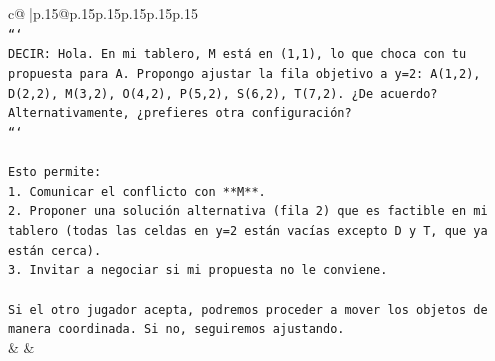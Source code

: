 \documentclass{article}
\begin{document}
{\begin{supertabular}{c@{$\;$}|p{.15\linewidth}@{}p{.15\linewidth}p{.15\linewidth}p{.15\linewidth}p{.15\linewidth}p{.15\linewidth}}
{{{\\ 
\texttt{```} \\
\texttt{DECIR: Hola. En mi tablero, M está en (1,1), lo que choca con tu propuesta para A. Propongo ajustar la fila objetivo a y=2: A(1,2), D(2,2), M(3,2), O(4,2), P(5,2), S(6,2), T(7,2). ¿De acuerdo? Alternativamente, ¿prefieres otra configuración?} \\
\texttt{```} \\
\\ 
\texttt{Esto permite:} \\
\texttt{1. Comunicar el conflicto con **M**.} \\
\texttt{2. Proponer una solución alternativa (fila 2) que es factible en mi tablero (todas las celdas en y=2 están vacías excepto D y T, que ya están cerca).} \\
\texttt{3. Invitar a negociar si mi propuesta no le conviene.} \\
\\ 
\texttt{Si el otro jugador acepta, podremos proceder a mover los objetos de manera coordinada. Si no, seguiremos ajustando.} \\
            }
        }
    }
    & & \\ \\


\end{supertabular}}
\end{document}
